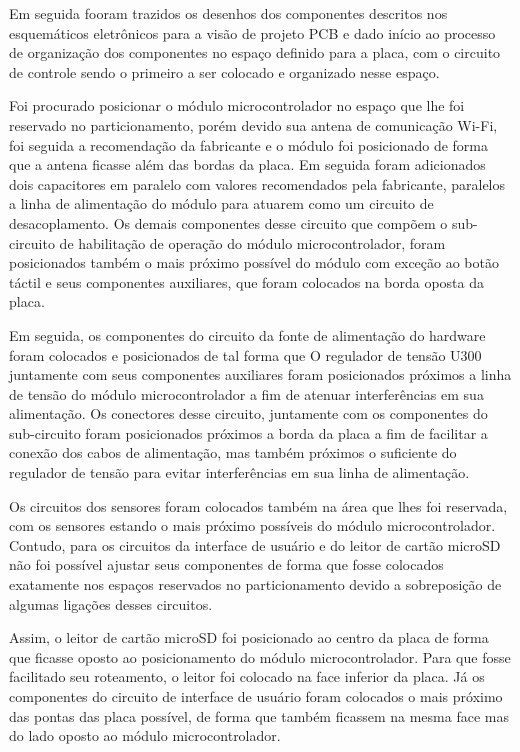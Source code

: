 Em seguida fooram trazidos os desenhos dos componentes descritos nos esquemáticos eletrônicos para a visão de projeto PCB e dado início ao processo de organização dos componentes no espaço definido para a placa, com o circuito de controle sendo o primeiro a ser colocado e organizado nesse espaço.

Foi procurado posicionar o módulo microcontrolador no espaço que lhe foi reservado no particionamento, porém devido sua antena de comunicação Wi-Fi, foi seguida a recomendação da fabricante e o módulo foi posicionado de forma que a antena ficasse além das bordas da placa. Em seguida foram adicionados dois capacitores em paralelo com valores recomendados pela fabricante, paralelos a linha de alimentação do módulo para atuarem como um circuito de desacoplamento. Os demais componentes desse circuito que compõem o sub-circuito de habilitação de operação do módulo microcontrolador, foram posicionados também o mais próximo possível do módulo com exceção ao botão táctil e seus componentes auxiliares, que foram colocados na borda oposta da placa.

Em seguida, os componentes do circuito da fonte de alimentação do hardware foram colocados e posicionados de tal forma que O regulador de tensão U300 juntamente com seus componentes auxiliares foram posicionados próximos a linha de tensão do módulo microcontrolador a fim de atenuar interferências em sua alimentação. Os conectores desse circuito, juntamente com os componentes do sub-circuito foram posicionados próximos a borda da placa a fim de facilitar a conexão dos cabos de alimentação, mas também próximos o suficiente do regulador de tensão para evitar interferências em sua linha de alimentação. 

Os circuitos dos sensores foram colocados também na área que lhes foi reservada, com os sensores estando o mais próximo possíveis do módulo microcontrolador. Contudo, para os circuitos da interface de usuário e do leitor de cartão microSD não foi possível ajustar seus componentes de forma que fosse colocados exatamente nos espaços reservados no particionamento devido a sobreposição de algumas ligações desses circuitos.

Assim, o leitor de cartão microSD foi posicionado ao centro da placa de forma que ficasse oposto ao posicionamento do módulo microcontrolador. Para que fosse facilitado seu roteamento, o leitor foi colocado na face inferior da placa. Já os componentes do circuito de interface de usuário foram colocados o mais próximo das pontas das placa possível, de forma que também ficassem na mesma face mas do lado oposto ao módulo microcontrolador.


